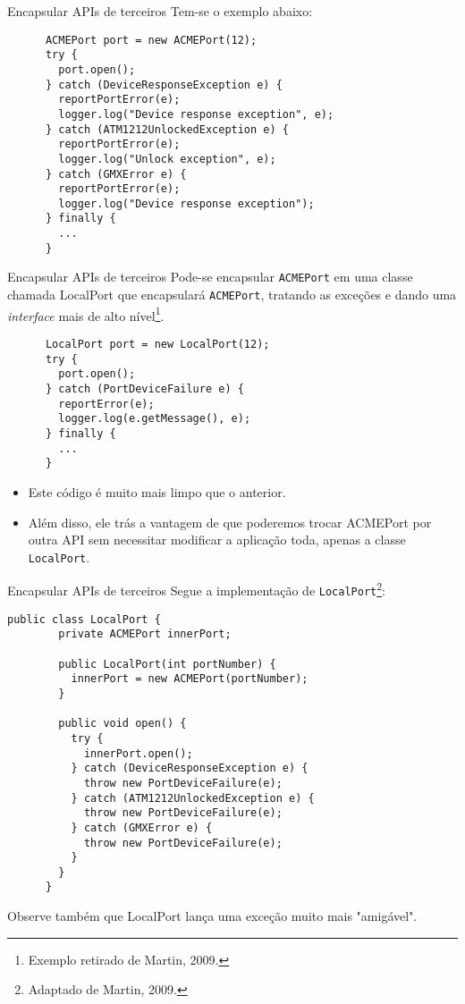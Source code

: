\documentclass[11pt]{beamer}
\begin{document}
  \begin{frame}[fragile]{Encapsular APIs de terceiros}
    Tem-se o exemplo abaixo:
    \begin{lstlisting}
      ACMEPort port = new ACMEPort(12);
      try {
        port.open();
      } catch (DeviceResponseException e) {
        reportPortError(e);
        logger.log("Device response exception", e);
      } catch (ATM1212UnlockedException e) {
        reportPortError(e);
        logger.log("Unlock exception", e);
      } catch (GMXError e) {
        reportPortError(e);
        logger.log("Device response exception");
      } finally {
        ...
      }
    \end{lstlisting}
  \end{frame}

  \begin{frame}[fragile]{Encapsular APIs de terceiros}
    Pode-se encapsular \verb|ACMEPort| em uma classe chamada LocalPort que encapsulará \verb|ACMEPort|, tratando as exceções e dando uma \textit{interface} mais de alto nível\footnote{Exemplo retirado de Martin, 2009.}.
    \begin{lstlisting}
      LocalPort port = new LocalPort(12);
      try {
        port.open();
      } catch (PortDeviceFailure e) {
        reportError(e);
        logger.log(e.getMessage(), e);
      } finally {
        ...
      }
    \end{lstlisting}
    \begin{itemize}
      \item Este código é muito mais limpo que o anterior.
      \item Além disso, ele trás a vantagem de que poderemos trocar ACMEPort por outra API sem necessitar modificar a aplicação toda, apenas a classe \verb|LocalPort|.
    \end{itemize}
  \end{frame}

  \begin{frame}[fragile]{Encapsular APIs de terceiros}
    Segue a implementação de \verb|LocalPort|\footnote{Adaptado de Martin, 2009.}:
    \begin{lstlisting}[basicstyle=\tiny]
      public class LocalPort {
        private ACMEPort innerPort;

        public LocalPort(int portNumber) {
          innerPort = new ACMEPort(portNumber);
        }

        public void open() {
          try {
            innerPort.open();
          } catch (DeviceResponseException e) {
            throw new PortDeviceFailure(e);
          } catch (ATM1212UnlockedException e) {
            throw new PortDeviceFailure(e);
          } catch (GMXError e) {
            throw new PortDeviceFailure(e);
          }
        }
      }
    \end{lstlisting}
    Observe também que LocalPort lança uma exceção muito mais "amigável".
  \end{frame}
\end{document}
